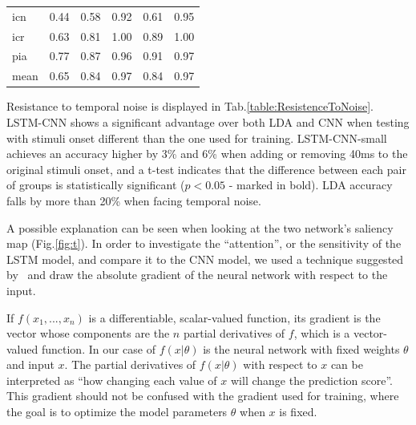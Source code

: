 \documentclass[
12pt, %
english, %
doublespacing, %
headsepline, %
]{MastersDoctoralThesis} %
\begin{document}
\begin{table}[t]
\begin{tabular}{l|ccccc}
		icn     &                  0.44 &                  0.58 &                            0.92 &                             0.61 &                                               0.95 \\
		icr     &                  0.63 &                  0.81 &                            1.00 &                             0.89 &                                               1.00 \\
		pia     &                  0.77 &                  0.87 &                            0.96 &                             0.91 &                                               0.97 \\
		mean    &                  0.65 &                  0.84 &                            0.97 &                             0.84 &                                               0.97 \\
		\bottomrule
	\end{tabular}
\end{table}

\vspace{5mm}

Resistance to temporal noise is displayed in Tab.\ref{table:ResistenceToNoise}. LSTM-CNN shows a significant advantage over both LDA and CNN when testing with stimuli onset different than the one used for training. LSTM-CNN-small achieves an accuracy higher by 3\% and 6\% when adding or removing 40ms to the original stimuli onset, and a t-test indicates that the difference between each pair of groups is statistically significant ($p < 0.05$ - marked in bold). LDA accuracy falls by more than 20\% when facing temporal noise.

A possible explanation can be seen when looking at the two network's saliency map (Fig.\ref{fig:t}). In order to investigate the ``attention'', or the sensitivity of the LSTM model, and compare it to the CNN model, we used a technique suggested by~\cite{graves2012supervised} and draw the absolute gradient of the neural network with respect to the input.

If $f(x_{1}, ..., x_{n})$ is a differentiable, scalar-valued function, its gradient is the vector whose components are the $n$ partial derivatives of $f$, which is a vector-valued function. In our case of $f(x|\theta)$ is the neural network with fixed weights $\theta$ and input $x$. The partial derivatives of $f(x|\theta)$ with respect to $x$ can be interpreted as ``how changing each value of $x$ will change the prediction score''. This gradient should not be confused with the gradient used for training, where the goal is to optimize the model parameters $\theta$ when $x$ is fixed.
\end{document}
